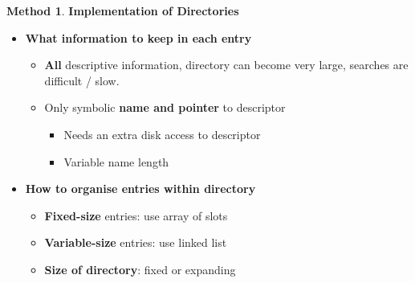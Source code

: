 \documentclass[11pt,a4paper]{article}
\theoremstyle{definition}
\newtheorem{method}{Method}[section]
\newenvironment{myitemize}
{ \begin{itemize}
    \setlength{\itemsep}{5pt}
    \setlength{\parskip}{0pt}
    \setlength{\parsep}{0pt}     }
{ \end{itemize}                  }
\begin{document}
\begin{minipage}{0.45\linewidth}
	\begin{method}{\textbf{Implementation of Directories}}
		\begin{myitemize} 
		\item \textbf{What information to keep in each entry}
		\begin{myitemize}
			\item \textbf{All} descriptive information, directory can become very large, searches are difficult / slow.
			\item Only symbolic \textbf{name and pointer} to descriptor
			\begin{myitemize}
				\item Needs an extra disk access to descriptor
				\item Variable name length
			\end{myitemize}
		\end{myitemize}
		\item \textbf{How to organise entries within directory}
		\begin{myitemize}
			\item \textbf{Fixed-size} entries: use array of slots
			\item \textbf{Variable-size} entries: use linked list
			\item \textbf{Size of directory}: fixed or expanding
		\end{myitemize}
	\end{myitemize}
	\end{method}
	\end{minipage}\hspace{5mm}
\end{document}
